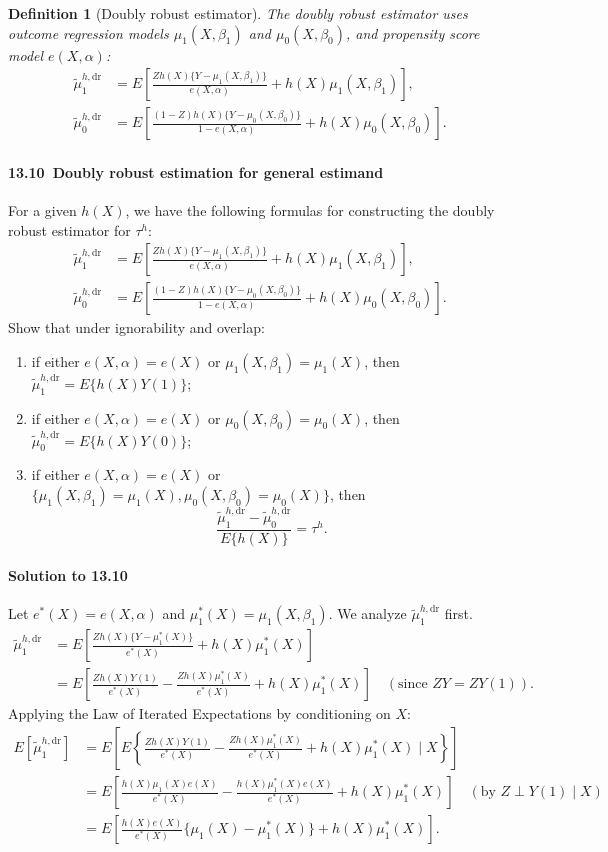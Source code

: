 \documentclass[krantz1]{krantz}
\newtheorem{definition}{Definition}
\def\ind{\perp}
\def\Paragraph{\paragraph}
\begin{document}
\begin{definition}[Doubly robust estimator]\label{13:def:DR-estimator}
The doubly robust estimator uses outcome regression models $\mu_1(X,\beta_1)$ and $\mu_0(X,\beta_0)$, and propensity score model $e(X,\alpha)$:
\begin{align*}
\tilde{\mu}_1^{h,\mathrm{dr}} &= E\left[\frac{Zh(X)\{Y-\mu_1(X,\beta_1)\}}{e(X,\alpha)} + h(X)\mu_1(X,\beta_1)\right], \\
\tilde{\mu}_0^{h,\mathrm{dr}} &= E\left[\frac{(1-Z)h(X)\{Y-\mu_0(X,\beta_0)\}}{1-e(X,\alpha)} + h(X)\mu_0(X,\beta_0)\right].
\end{align*}
\end{definition}
 \Paragraph{13.10~Doubly robust estimation for general estimand}\label{hw::general-estimand-dr}

For a given $h(X)$, we have the following formulas for constructing the doubly robust estimator for $\tau^h$:
\begin{align*}
\tilde{\mu}_1^{h,\mathrm{dr}} &= E\left[\frac{Zh(X)\{ Y-\mu_1(X,\beta_1) \}}{e(X,\alpha)} + h(X)\mu_1(X,\beta_1)\right], \\
\tilde{\mu}_0^{h,\mathrm{dr}} &= E\left[\frac{(1-Z)h(X)\{ Y-\mu_0(X,\beta_0) \}}{1-e(X,\alpha)} + h(X)\mu_0(X,\beta_0)\right].
\end{align*}
Show that under ignorability and overlap:
\begin{enumerate}
\item
if either $e(X,\alpha) = e(X)$ or $\mu_1(X,\beta_1) = \mu_1(X)$, then $\tilde{\mu}_1^{h,\mathrm{dr}} = E\{h(X)Y(1)\}$;
\item
if either $e(X,\alpha) = e(X)$ or $\mu_0(X,\beta_0) = \mu_0(X)$, then $\tilde{\mu}_0^{h,\mathrm{dr}} = E\{h(X)Y(0)\}$;
\item
if either $e(X,\alpha) = e(X)$ or $\{\mu_1(X,\beta_1) = \mu_1(X), \mu_0(X,\beta_0) = \mu_0(X)\}$, then
$$
\frac{\tilde{\mu}_1^{h,\mathrm{dr}} - \tilde{\mu}_0^{h,\mathrm{dr}}}{E\{h(X)\}} = \tau^h.
$$
\end{enumerate}

\Paragraph{Solution to 13.10}

Let $e^*(X) = e(X, \alpha)$ and $\mu_1^*(X) = \mu_1(X, \beta_1)$. We analyze $\tilde{\mu}_1^{h,\mathrm{dr}}$ first.
\begin{align*}
    \tilde{\mu}_1^{h,\mathrm{dr}} &= E\left[\frac{Zh(X)\{Y - \mu_1^*(X)\}}{e^*(X)} + h(X)\mu_1^*(X)\right] \\
    &= E\left[ \frac{Zh(X)Y(1)}{e^*(X)} - \frac{Zh(X)\mu_1^*(X)}{e^*(X)} + h(X)\mu_1^*(X) \right] \quad (\text{since } ZY = ZY(1)).
\end{align*}
Applying the Law of Iterated Expectations by conditioning on $X$:
\begin{align*}
    E[\tilde{\mu}_1^{h,\mathrm{dr}}] &= E\left[ E\left\{ \frac{Zh(X)Y(1)}{e^*(X)} - \frac{Zh(X)\mu_1^*(X)}{e^*(X)} + h(X)\mu_1^*(X) \mid X \right\} \right] \\
    &= E\left[ \frac{h(X) \mu_1(X) e(X)}{e^*(X)} - \frac{h(X)\mu_1^*(X)e(X)}{e^*(X)} + h(X)\mu_1^*(X) \right] \quad (\text{by } Z \ind Y(1) \mid X) \\
    &= E\left[ \frac{h(X)e(X)}{e^*(X)} \{ \mu_1(X) - \mu_1^*(X) \} + h(X)\mu_1^*(X) \right].
\end{align*}
\end{document}
